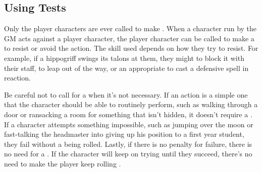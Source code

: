 
\subsection{Using Tests}

Only the player characters are ever called to make {\tests}.
When a character run by the GM acts against a player character, the player character can be called to make a {\test} to resist or avoid the action.
The skill used depends on how they try to resist.
For example, if a hippogriff swings its talons at them, they might {\test}  to block it with their staff, {\test}  to leap out of the way, or {\test} an appropriate {\magicskill} to cast a defensive spell in reaction.

Be careful not to call for a {\test} when it's not necessary.
If an action is a simple one that the character should be able to routinely perform, such as walking through a door or ransacking a room for something that isn't hidden, it doesn't require a {\test}.
If a character attempts something impossible, such as jumping over the moon or fast-talking the headmaster into giving up his position to a first year student, they fail without a {\test} being rolled.
Lastly, if there is no penalty for failure, there is no need for a {\test}.
If the character will keep on trying until they succeed, there's no need to make the player keep rolling {\tests}.
